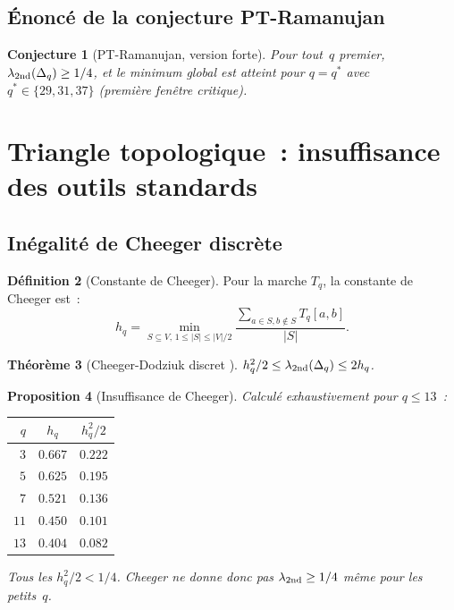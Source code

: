 \documentclass[11pt,a4paper]{article}
\newtheorem{theorem}{Théorème}[section]
\newtheorem{proposition}[theorem]{Proposition}
\newtheorem{conjecture}[theorem]{Conjecture}
\theoremstyle{definition}
\newtheorem{definition}[theorem]{Définition}
\begin{document}
\subsection{Énoncé de la conjecture PT-Ramanujan}

\begin{conjecture}[PT-Ramanujan, version forte]
\label{conj:pt_ram_strong}
Pour tout~$q$ premier, $\lambda_{\rm 2nd}(\Delta_q) \geq 1/4$, et
le minimum global est atteint pour $q = q^*$ avec
$q^* \in \{29, 31, 37\}$ (première fenêtre critique).
\end{conjecture}

\section{Triangle topologique~: insuffisance des outils standards}
\label{sec:topo}

\subsection{Inégalité de Cheeger discrète}

\begin{definition}[Constante de Cheeger]
\label{def:cheeger}
Pour la marche $T_q$, la constante de Cheeger est~:
\begin{equation}
  h_q = \min_{S\subseteq V,\,1\leq |S|\leq |V|/2}
        \frac{\sum_{a\in S, b\notin S} T_q[a,b]}{|S|}.
\end{equation}
\end{definition}

\begin{theorem}[Cheeger-Dodziuk discret {}]
\label{thm:cheeger_dodziuk}
$h_q^2/2 \leq \lambda_{\rm 2nd}(\Delta_q) \leq 2h_q$.
\end{theorem}

\begin{proposition}[Insuffisance de Cheeger]
\label{prop:cheeger_insuff}
Calculé exhaustivement pour $q\leq 13$~:
\begin{center}
\renewcommand{\arraystretch}{1.2}
\begin{tabular}{rcc}
\toprule
$q$ & $h_q$ & $h_q^2/2$ \\
\midrule
$3$  & $0.667$ & $0.222$ \\
$5$  & $0.625$ & $0.195$ \\
$7$  & $0.521$ & $0.136$ \\
$11$ & $0.450$ & $0.101$ \\
$13$ & $0.404$ & $0.082$ \\
\bottomrule
\end{tabular}
\end{center}
Tous les $h_q^2/2 < 1/4$. Cheeger ne donne donc \emph{pas}
$\lambda_{\rm 2nd} \geq 1/4$ même pour les petits~$q$.
\end{proposition}
\end{document}
